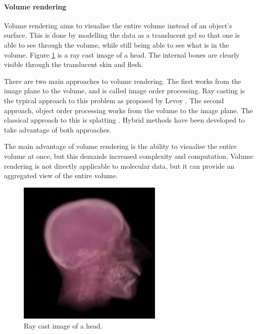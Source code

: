 
\paragraph{Volume rendering}

Volume rendering aims to visualise the entire volume instead of an object's
surface. This is done by modelling the data as a translucent gel so that one is
able to see through the volume, while still being able to see what is in the
volume. Figure \ref{fig:background_head} is a ray cast image of a head. The
internal bones are clearly visible through the translucent skin and flesh.

There are two main approaches to volume rendering. The first works from the
image plane to the volume, and is called image order processing. Ray casting is
the typical approach to this problem as proposed by Levoy \citep{levoy88}. The
second approach, object order processing works from the volume to the image
plane. The classical approach to this is splatting \citep{westover89}. Hybrid
methods have been developed to take advantage of both approaches.

The main advantage of volume rendering is the ability to visualise the entire
volume at once, but this demands increased complexity and computation. Volume
rendering is not directly applicable to molecular data, but it can provide an
aggregated view of the entire volume.

\begin{figure}
  \begin{center}
    \includegraphics[width=70mm]{head_volume}
  \end{center}
  \caption{Ray cast image of a head.}
  \label{fig:background_head}
\end{figure}


